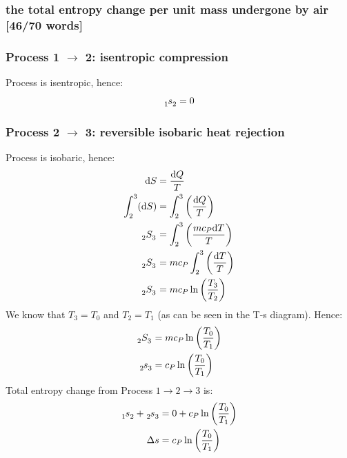 \documentclass[12pt]{article}
\numberwithin{equation}{section}
\begin{document}
\begin{flushleft}
\subsubsection[Entropy change.]{the total entropy change per unit mass undergone by air [46/70 words]}
\subsubsection*{Process 1 $\rightarrow$ 2: isentropic compression}
Process is isentropic, hence:
\begin{equation}
  \tensor[_1]{s}{_2} = 0
\end{equation}
\subsubsection*{Process 2 $\rightarrow$ 3: reversible isobaric heat rejection}
Process is isobaric, hence:
\begin{align}
  \mathrm{d}S &= \frac{\mathrm{d}Q}{T}\\
  \int_2^3 (\mathrm{d}S) &= \int_2^3 \left(\frac{\mathrm{d}Q}{T} \right)\\
  \tensor[_2]{S}{_3} &= \int_2^3 \left(\frac{mc_P\mathrm{d}T}{T}\right)\\
  \tensor[_2]{S}{_3} &= mc_P\int_2^3 \left(\frac{\mathrm{d}T}{T}\right)\\
  \tensor[_2]{S}{_3} &= mc_P \ln \left( \frac{T_3}{T_2} \right)
\end{align}
We know that $T_3 = T_0$ and $T_2 = T_1$ (as can be seen in the T-s diagram). Hence:
\begin{align}
  \tensor[_2]{S}{_3} &= mc_P \ln \left( \frac{T_0}{T_1} \right)\\
  \tensor[_2]{s}{_3} &= c_P \ln \left( \frac{T_0}{T_1} \right)
\end{align}
Total entropy change from Process $1 \rightarrow 2 \rightarrow 3$ is:
\begin{align}
  \tensor[_1]{s}{_2} + \tensor[_2]{s}{_3} &= 0 + c_P \ln \left( \frac{T_0}{T_1} \right)\\
  \Delta s &= c_P \ln \left( \frac{T_0}{T_1} \right)
\end{align}


\end{flushleft}
\end{document}
